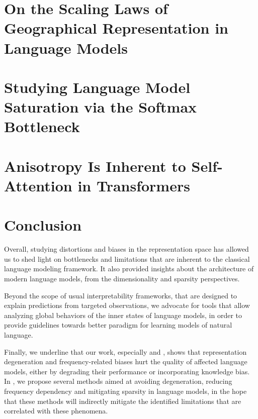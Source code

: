 
\chapter{On the Scaling Laws of Geographical Representation in Language Models}
\label{chap:geobias}


\chapter{Studying Language Model Saturation via the Softmax Bottleneck}
\label{chap:softmax_bottleneck}


\chapter{Anisotropy Is Inherent to Self-Attention in Transformers}


\label{chap:anisotropy}

\chapter*{Conclusion}

Overall, studying distortions and biases in the representation space has allowed us to shed light on bottlenecks and limitations that are inherent to the classical language modeling framework. It also provided insights about the architecture of modern language models, from the dimensionality and sparsity perspectives. 

Beyond the scope of usual interpretability frameworks, that are designed to explain predictions from targeted observations, we advocate for tools that allow analyzing global behaviors of the inner states of language models, in order to provide guidelines towards better paradigm for learning models of natural language.

Finally, we underline that our work, especially  and , shows that representation degeneration and frequency-related biases hurt the quality of affected language models, either by degrading their performance or incorporating knowledge bias. In , we propose several methods aimed at avoiding degeneration, reducing frequency dependency and mitigating sparsity in language models, in the hope that these methods will indirectly mitigate the identified limitations that are correlated with these phenomena.

% 
% 
% 
